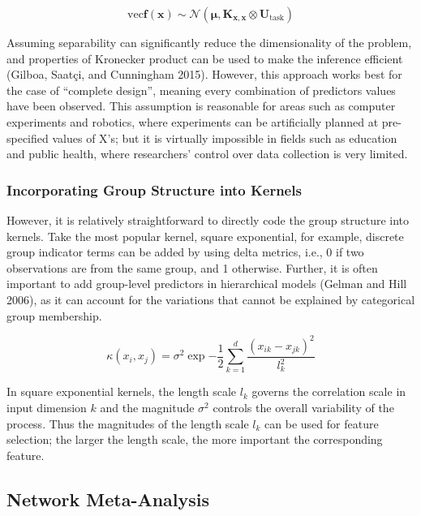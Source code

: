 \begin{equation*}
\text{vec}{\bm f(\bm x)} \sim \mathcal{N}(\bm \mu, \bm K_{\bm x, \bm x} \otimes \bm U_{\text{task}})
\end{equation*}

\noindent Assuming separability can significantly reduce the
dimensionality of the problem, and properties of Kronecker product can
be used to make the inference efficient (Gilboa, Saatçi, and Cunningham
2015). However, this approach works best for the case of ``complete
design'', meaning every combination of predictors values have been
observed. This assumption is reasonable for areas such as computer
experiments and robotics, where experiments can be artificially planned
at pre-specified values of X's; but it is virtually impossible in fields
such as education and public health, where researchers' control over
data collection is very limited.

\subsubsection{Incorporating Group Structure into
Kernels}\label{incorporating-group-structure-into-kernels}

However, it is relatively straightforward to directly code the group
structure into kernels. Take the most popular kernel, square
exponential, for example, discrete group indicator terms can be added by
using delta metrics, i.e., 0 if two observations are from the same
group, and 1 otherwise. Further, it is often important to add
group-level predictors in hierarchical models (Gelman and Hill 2006), as
it can account for the variations that cannot be explained by
categorical group membership.

\begin{equation*}
\kappa(x_i, x_j)=\sigma^2\exp{-\frac{1}{2}\sum_{k=1}^d \frac{(x_{ik}-x_{jk})^2}{l_k^2}}
\end{equation*}

\noindent In square exponential kernels, the length scale \(l_k\)
governs the correlation scale in input dimension \(k\) and the magnitude
\(\sigma^2\) controls the overall variability of the process. Thus the
magnitudes of the length scale \(l_k\) can be used for feature
selection; the larger the length scale, the more important the
corresponding feature.

\subsection{Network Meta-Analysis}\label{network-meta-analysis}

